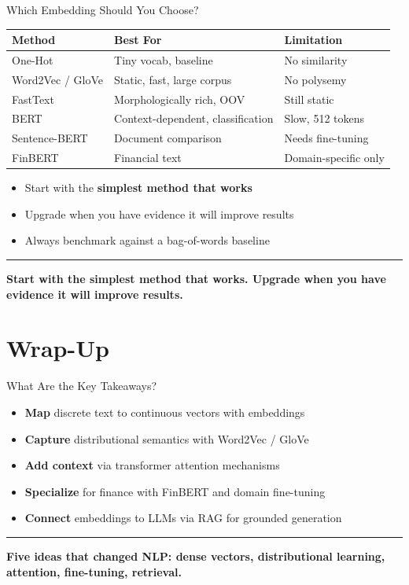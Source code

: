 \documentclass[8pt,aspectratio=169]{beamer}
\newcommand{\bottomnote}[1]{%
\vfill
\vspace{-2mm}
\textcolor{mllavender2}{\rule{\textwidth}{0.4pt}}
\vspace{1mm}
\footnotesize
\textbf{#1}
}
\newenvironment{compactlist}{%
  \begin{itemize}%
    \setlength{\itemsep}{2pt}%
    \setlength{\parskip}{0pt}%
    \setlength{\parsep}{0pt}%
}{%
  \end{itemize}%
}
\newcommand{\highlight}[1]{\textcolor{mlorange}{\textbf{#1}}}
\begin{document}
\begin{frame}{Which Embedding Should You Choose?}
\begin{center}
\small
\begin{tabular}{@{}l l l@{}}
\toprule
\textbf{Method} & \textbf{Best For} & \textbf{Limitation} \\
\midrule
One-Hot & Tiny vocab, baseline & No similarity \\
Word2Vec / GloVe & Static, fast, large corpus & No polysemy \\
FastText & Morphologically rich, OOV & Still static \\
BERT & Context-dependent, classification & Slow, 512 tokens \\
Sentence-BERT & Document comparison & Needs fine-tuning \\
FinBERT & Financial text & Domain-specific only \\
\bottomrule
\end{tabular}
\normalsize
\end{center}

\vspace{2mm}
\begin{compactlist}
\item Start with the \highlight{simplest method that works}
\item Upgrade when you have evidence it will improve results
\item Always benchmark against a bag-of-words baseline
\end{compactlist}
\bottomnote{Start with the simplest method that works. Upgrade when you have evidence it will improve results.}
\end{frame}

\section{Wrap-Up}

\begin{frame}{What Are the Key Takeaways?}
\begin{compactlist}
\item \highlight{Map} discrete text to continuous vectors with embeddings
\item \highlight{Capture} distributional semantics with Word2Vec / GloVe
\item \highlight{Add context} via transformer attention mechanisms
\item \highlight{Specialize} for finance with FinBERT and domain fine-tuning
\item \highlight{Connect} embeddings to LLMs via RAG for grounded generation
\end{compactlist}
\bottomnote{Five ideas that changed NLP: dense vectors, distributional learning, attention, fine-tuning, retrieval.}
\end{frame}
\end{document}
